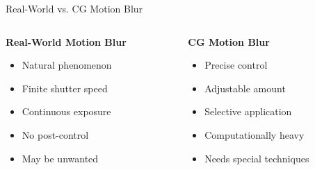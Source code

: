 \documentclass[aspectratio=169]{beamer}
\begin{document}
\begin{frame}{Real-World vs. CG Motion Blur}
    \begin{columns}[t]
        \begin{column}{0.48\textwidth}
            \textbf{Real-World Motion Blur}
            \begin{itemize}
                \item[\textcolor{green}{\checkmark}] Natural phenomenon
                \item[\textcolor{green}{\checkmark}] Finite shutter speed
                \item[\textcolor{green}{\checkmark}] Continuous exposure
                \item[\textcolor{red}{\times}] No post-control
                \item[\textcolor{red}{\times}] May be unwanted
            \end{itemize}
            
            \vspace{0.2cm}
            \hspace{1cm}
        \end{column}
        
        \begin{column}{0.48\textwidth}
            \textbf{CG Motion Blur}
            \begin{itemize}
                \item[\textcolor{green}{\checkmark}] Precise control
                \item[\textcolor{green}{\checkmark}] Adjustable amount
                \item[\textcolor{green}{\checkmark}] Selective application  
                \item[\textcolor{red}{\times}] Computationally heavy
                \item[\textcolor{red}{\times}] Needs special techniques
            \end{itemize}
            

\end{column}
\end{columns}
\end{frame}
\end{document}
